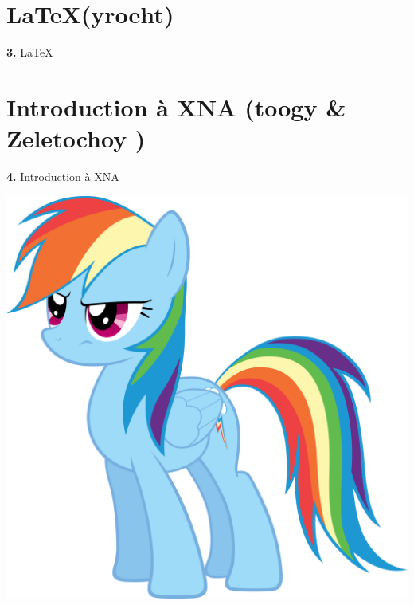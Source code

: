 \documentclass[12pt]{beamer}
\begin{document}
\section{\LaTeX  (yroeht)}

\begingroup
{}
\begin{frame}
    \begin{center}
        \vspace{1cm}
        {\Huge\color{background} \textbf{3.} {\selectfont\LaTeX}}
    \end{center}
\end{frame}
\endgroup

\section{Introduction à XNA (toogy \& Zeletochoy )}

\begin{frame}
    \begin{center}
        \vspace{1cm}

        {\Large \textbf{4.} Introduction à XNA} \\

        \vspace{0.5cm}

        \includegraphics[scale=0.65]{img/rd.png}
    \end{center}
\end{frame}
\end{document}
